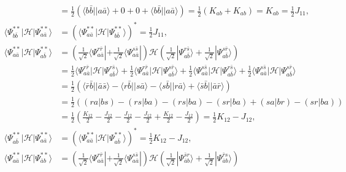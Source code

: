 \documentclass[a4paper]{book}
\newcounter{solution}[chapter]
\begin{document}
\begin{solution}
\begin{itemize}
\begin{align*}
		&= \frac{1}{2} \left( \langle b \bar{b} || a \bar{a} \rangle + 0 + 0 + \langle b \bar{b} || a \bar{a} \rangle \right) = \frac{1}{2} \left( K_{ab} + K_{ab} \right) = K_{ab} = \frac{1}{2} J_{11}, \\
		\langle \Psi^{**}_{b\bar{b}}| \mathscr{H} | \Psi^{**}_{a\bar{a}} \rangle &= ( \langle \Psi^{**}_{a\bar{a}} | \mathscr{H} | \Psi^{**}_{b\bar{b}} \rangle )^* =  \frac{1}{2} J_{11}, \\
		\langle \Psi^{**}_{a\bar{a}} | \mathscr{H} | \Psi^{**}_{a\bar{b}} \rangle &= \left( \frac{1}{ \sqrt{2} } \langle \Psi^{ r \bar{r} }_{a \bar{a}} | + \frac{1}{ \sqrt{2} } \langle \Psi^{ s \bar{s} }_{a \bar{a}} | \right) \mathscr{H} \left( \frac{1}{ \sqrt{2} } | \Psi^{ r \bar{s} }_{a \bar{b}} \rangle + \frac{1}{ \sqrt{2} } | \Psi^{ s \bar{r} }_{a \bar{b}} \rangle \right) \\
		&= \frac{1}{2} \langle \Psi^{ r \bar{r} }_{a \bar{a}} | \mathscr{H} | \Psi^{ r \bar{s} }_{a \bar{b}} \rangle + \frac{1}{2} \langle \Psi^{ r \bar{r} }_{a \bar{a}} | \mathscr{H} | \Psi^{ s \bar{r} }_{a \bar{b}} \rangle + \frac{1}{2} \langle \Psi^{ s \bar{s} }_{a \bar{a}} | \mathscr{H} | \Psi^{ r \bar{s} }_{a \bar{b}} \rangle + \frac{1}{2} \langle \Psi^{ s \bar{s} }_{a \bar{a}} | \mathscr{H} | \Psi^{ s \bar{r} }_{a \bar{b}} \rangle \\
		&= \frac{1}{2} \left( \langle \bar{r} \bar{b} || \bar{a} \bar{s} \rangle - \langle r \bar{b} || s \bar{a} \rangle - \langle s \bar{b} || r \bar{a} \rangle + \langle \bar{s} \bar{b} || \bar{a} \bar{r} \rangle \right) \\
		&= \frac{1}{2} \left( (ra|bs) - (rs|ba) - (rs|ba) - (sr|ba) + (sa|br) - (sr|ba) \right) \\
		&= \frac{1}{2} \left( \frac{ K_{12} }{2} - \frac{ J_{12} }{2} - \frac{ J_{12} }{2} - \frac{ J_{12} }{2} + \frac{ K_{12} }{2} - \frac{ J_{12} }{2} \right) = \frac{1}{2} K_{12} - J_{12}, \\
		\langle \Psi^{**}_{a\bar{b}} | \mathscr{H} | \Psi^{**}_{a\bar{a}} \rangle &= ( \langle \Psi^{**}_{a\bar{a}} | \mathscr{H} | \Psi^{**}_{a\bar{b}} \rangle )^* = \frac{1}{2} K_{12} - J_{12}, \\
		\langle \Psi^{**}_{a\bar{a}} | \mathscr{H} | \Psi^{**}_{\bar{a} b} \rangle &= \left( \frac{1}{ \sqrt{2} } \langle \Psi^{ r \bar{r} }_{a \bar{a}} | + \frac{1}{ \sqrt{2} } \langle \Psi^{ s \bar{s} }_{a \bar{a}} | \right) \mathscr{H} \left( \frac{1}{ \sqrt{2} } | \Psi^{ \bar{s} r }_{\bar{a} b} \rangle + \frac{1}{ \sqrt{2} } | \Psi^{ \bar{r} s }_{\bar{a} b} \rangle \right) \\

\end{align*}
\end{itemize}
\end{solution}
\end{document}
